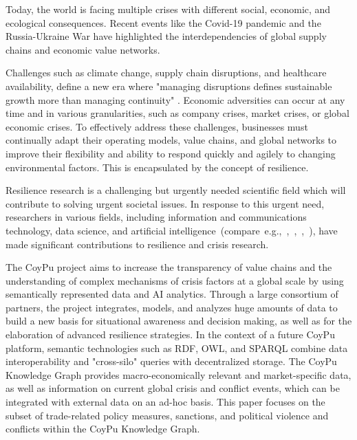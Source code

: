 Today, the world is facing multiple crises with different social, economic, and ecological consequences. Recent events like the Covid-19 pandemic and the Russia-Ukraine War have highlighted the interdependencies of global supply chains and economic value networks. 

Challenges such as climate change, supply chain disruptions, and healthcare availability, define a new era where "managing disruptions defines sustainable growth more than managing continuity" \cite{McKinsey2022}. Economic adversities can occur at any time and in various granularities, such as company crises, market crises, or global economic crises. To effectively address these challenges, businesses must continually adapt their operating models, value chains, and global networks to improve their flexibility and ability to respond quickly and agilely to changing environmental factors. This is encapsulated by the concept of resilience.

Resilience research is a challenging but urgently needed scientific field which will contribute to solving urgent societal issues. In response to this urgent need, researchers in various fields, including information and communications technology, data science, and artificial intelligence~(compare~e.g.,~\cite{Palen2007},~\cite{Alshaikh2012},~\cite{Soden2014},~\cite{Soden2018}), have made significant contributions to resilience and crisis research. 

The CoyPu project \cite{CoyPu} aims to increase the transparency of value chains and the understanding of complex mechanisms of crisis factors at a global scale by using semantically represented data and AI analytics. Through a large consortium of partners, the project integrates, models, and analyzes huge amounts of data to build a new basis for situational awareness and decision making, as well as for the elaboration of advanced resilience strategies. In the context of a future CoyPu platform, semantic technologies such as RDF, OWL, and SPARQL combine data interoperability and "cross-silo" queries with decentralized storage. The CoyPu Knowledge Graph provides macro-economically relevant and market-specific data, as well as information on current global crisis and conflict events, which can be integrated with external data on an ad-hoc basis. This paper focuses on the subset of trade-related policy measures, sanctions, and political violence and conflicts within the CoyPu Knowledge Graph.

